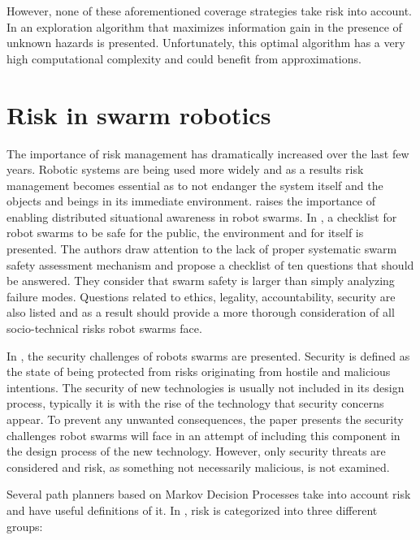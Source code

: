 However, none of these aforementioned coverage strategies take
risk into account. In
\cite{dames2012decentralized,schwagerMultirobotControlPolicy2017}
an exploration algorithm that maximizes information gain in the presence of unknown hazards is presented. Unfortunately, this optimal algorithm has a
very high computational complexity and could benefit from approximations.



\section{Risk in swarm robotics}
The importance of risk management has dramatically increased over the last few years. Robotic systems are being used more widely and as a results risk management becomes essential as to not endanger the system itself and the objects and beings in its immediate environment. \cite{jones2020distributed} raises the importance of enabling distributed situational awareness in robot swarms. In \cite{hunt2020checklist}, a checklist for robot swarms to be safe for the public, the environment and for itself is presented. The authors draw attention to the lack of proper systematic swarm safety assessment mechanism and propose a checklist of ten questions that should be answered. They consider that swarm safety is larger than simply analyzing failure modes. Questions related to ethics, legality, accountability, security are also listed and as a result should provide a more thorough consideration of all socio-technical risks robot swarms face. 

In \cite{higgins2009threats}, the security challenges of robots swarms are presented. Security is defined as the state of being protected from risks originating from hostile and malicious intentions. The security of new technologies is usually not included in its design process, typically it is with the rise of the technology that security concerns appear. To prevent any unwanted consequences, the paper presents the security challenges robot swarms will face in an attempt of including this component in the design process of the new technology. However, only security threats are considered and risk, as something not necessarily malicious, is not examined.

Several path planners based on Markov Decision Processes \cite{undurti2010online,thiebaux2016rao,xiao2020robot} take into account risk and have useful definitions of it. In \cite{xiao2020robot}, risk is categorized into three different groups:

